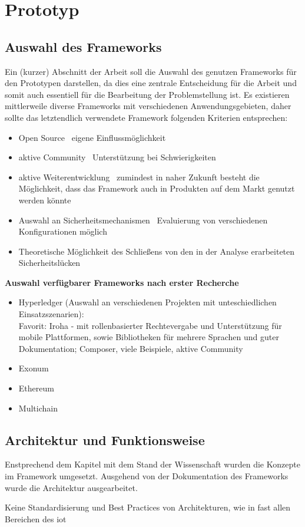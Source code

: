 \section{Prototyp}
\label{sec:prototype}

\subsection{Auswahl des Frameworks}
\label{sec:prototype_framework}
    Ein (kurzer) Abschnitt der Arbeit soll die Auswahl des genutzen Frameworks für den Prototypen darstellen, da dies eine zentrale Entscheidung für die Arbeit und somit auch essentiell für die Bearbeitung der Problemstellung ist.
    Es existieren mittlerweile diverse Frameworks mit verschiedenen Anwendungsgebieten, daher sollte das letztendlich verwendete Framework folgenden Kriterien entsprechen:
    \begin{itemize}
        \item Open Source \textrightarrow\ eigene Einflussmöglichkeit
        \item aktive Community \textrightarrow\ Unterstützung bei Schwierigkeiten
        \item aktive Weiterentwicklung \textrightarrow\ zumindest in naher Zukunft besteht die Möglichkeit, dass das Framework auch in Produkten auf dem Markt genutzt werden könnte
        \item Auswahl an Sicherheitsmechanismen \textrightarrow\ Evaluierung von verschiedenen Konfigurationen möglich
        \item Theoretische Möglichkeit des Schließens von den in der Analyse erarbeiteten Sicherheitslücken
    \end{itemize}
    \medskip
    \textbf{Auswahl verfügbarer Frameworks nach erster Recherche}
    \begin{itemize}
        \item Hyperledger (Auswahl an verschiedenen Projekten mit unteschiedlichen Einsatzszenarien):\\
            Favorit: Iroha - mit rollenbasierter Rechtevergabe und Unterstützung für mobile Plattformen, sowie Bibliotheken für mehrere Sprachen und guter Dokumentation; Composer, viele Beispiele, aktive Community
        \item Exonum
        \item Ethereum
        \item Multichain
    \end{itemize}



\subsection{Architektur und Funktionsweise}
\label{sec:prototype_functions}
    Enstprechend dem Kapitel mit dem Stand der Wissenschaft wurden die Konzepte im Framework umgesetzt.
    Ausgehend von der Dokumentation des Frameworks \cite{SoramitsuCo.} wurde die Architektur ausgearbeitet. 
    
    
    Keine Standardisierung und Best Practices von Architekturen, wie in fast allen Bereichen des \gls{iot}